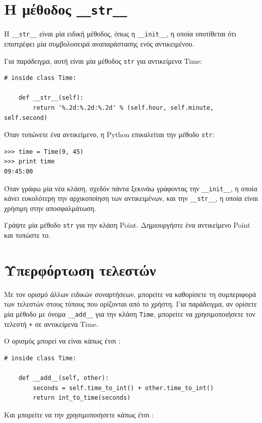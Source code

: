 \documentclass[10pt]{book}
\begin{document}
\section{Η μέθοδος {\tt \_\_str\_\_}}

H  \verb"__str__"  είναι μία ειδική μέθοδος, όπως η  \verb"__init__",  
η οποία υποτίθεται ότι επιστρέφει μία συμβολοσειρά αναπαράστασης ενός αντικειμένου.

Για παράδειγμα, αυτή είναι μία μέθοδος  {\tt str}  για αντικείμενα  Time:

\begin{verbatim}
# inside class Time:

    def __str__(self):
        return '%.2d:%.2d:%.2d' % (self.hour, self.minute, self.second)
\end{verbatim}
%
 Όταν τυπώνετε ένα αντικείμενο, η  Python  επικαλείται την μέθοδο  {\tt str}:

\begin{verbatim}
>>> time = Time(9, 45)
>>> print time
09:45:00
\end{verbatim}
%
 Όταν γράφω μία νέα κλάση, σχεδόν πάντα ξεκινάω γράφοντας την  
\verb"__init__",  η οποία κάνει ευκολότερη την αρχικοποίηση των αντικειμένων, και την 
\verb"__str__",  η οποία είναι χρήσιμη στην αποσφαλμάτωση.


\begin{exercise}

Γράψτε μία μέθοδο  {\tt str}  για την κλάση  Point.   Δημιουργήστε ένα αντικείμενο  Point  και τυπώστε το.
\end{exercise}


\section{Υπερφόρτωση τελεστών}
\label{operator.overloading}

Με τον ορισμό άλλων ειδικών συναρτήσεων, μπορείτε να καθορίσετε τη συμπεριφορά των τελεστών στους τύπους που ορίζονται από το χρήστη.  Για παράδειγμα, αν ορίσετε μία μέθοδο 
με όνομα  \verb"__add__"  για την κλάση  {\tt Time},  μπορείτε να χρησιμοποιήσετε τον τελεστή  {\tt +}  σε αντικείμενα  Time.

 Ο ορισμός μπορεί να είναι κάπως έτσι :

\begin{verbatim}
# inside class Time:

    def __add__(self, other):
        seconds = self.time_to_int() + other.time_to_int()
        return int_to_time(seconds)
\end{verbatim}
%
 Και μπορείτε να την χρησιμοποιήσετε κάπως έτσι :
\end{document}
